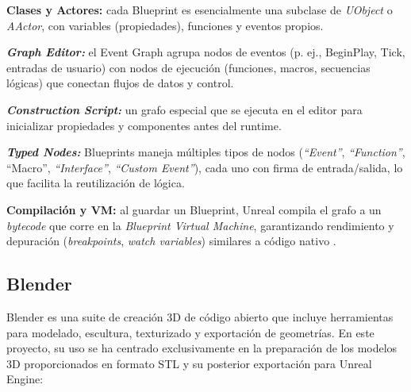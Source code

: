 \textbf{Clases y Actores:} cada Blueprint es esencialmente una subclase de \textit{UObject} o \textit{AActor}, con variables (propiedades), funciones y eventos propios.

\textbf{\textit{Graph Editor:}} el Event Graph agrupa nodos de eventos (p. ej., BeginPlay, Tick, entradas de usuario) con nodos de ejecución (funciones, macros, secuencias lógicas) que conectan flujos de datos y control.

\textbf{\textit{Construction Script:}} un grafo especial que se ejecuta en el editor para inicializar propiedades y componentes antes del runtime.

\textbf\textit{{Typed Nodes:}} Blueprints maneja múltiples tipos de nodos (\textit{“Event”}, \textit{“Function”}, “Macro”, \textit{“Interface”}, \textit{“Custom Event”}), cada uno con firma de entrada/salida, lo que facilita la reutilización de lógica.

\textbf{Compilación y VM:} al guardar un Blueprint, Unreal compila el grafo a un \textit{bytecode} que corre en la \textit{Blueprint Virtual Machine}, garantizando rendimiento y depuración (\textit{breakpoints}, \textit{watch variables}) similares a código nativo \cite{epicBlueprints}.

\subsection{Blender}

Blender es una suite de creación 3D de código abierto que incluye herramientas para modelado, escultura, texturizado y exportación de geometrías. En este proyecto, su uso se ha centrado exclusivamente en la preparación de los modelos 3D proporcionados en formato STL y su posterior exportación para Unreal Engine:

